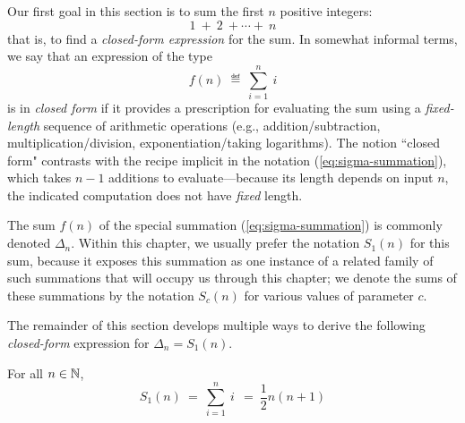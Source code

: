 Our first goal in this section is to sum the first $n$ positive integers:
\[ 1 \ + \ 2 \ + \cdots + \ n \]
that is, to find a {\it closed-form expression} for the sum.  In somewhat informal terms, we say that an expression of the type
\begin{equation}
\label{eq:sigma-summation}
f(n) \ \eqdef \ \sum_{i=1}^n \ i
\end{equation}
is in {\it closed form} if it provides a prescription for evaluating the sum using a {\em fixed-length} sequence of arithmetic operations (e.g., addition/subtraction, multiplication/division, exponentiation/taking logarithms).  The notion ``closed form" contrasts with the recipe implicit in the notation (\ref{eq:sigma-summation}), which takes $n-1$ additions to evaluate---because its length depends on input $n$, the indicated computation does not have {\em fixed} length. 

The sum $f(n)$ of the special summation  (\ref{eq:sigma-summation}) is commonly denoted $\Delta_n$.  Within this chapter, we usually prefer the notation $S_1(n)$ for this sum, because it
exposes this summation as one instance of a related family of such summations that will occupy us through this chapter; we denote the sums of these summations by the notation $S_c(n)$ for various values of parameter $c$.

\smallskip

The remainder of this section develops multiple ways to derive the following {\em closed-form} expression for $\Delta_n = S_1(n)$.

\begin{prop}
\label{thm:sum-first-integers-Gauss}
For all $n \in \mathbb{N}$,
\begin{equation}
\label{eq:sum-1-to-n}
S_1(n) \ = \ \sum_{i=1}^n \ i \  \ = \  \frac{1}{2} n (n+1) 
\end{equation}
\end{prop}


